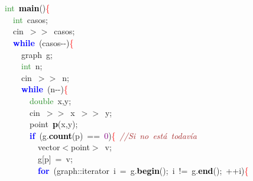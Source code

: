 \documentclass[10pt,a4paper,twoside]{article}
\begin{document}
{{{{{{\mbox{} \\
\mbox{} \\
\mbox{}\textcolor{ForestGreen}{int}\ \textbf{\textcolor{Black}{main}}\textcolor{BrickRed}{()}\textcolor{Red}{\{} \\
\mbox{}\ \ \textcolor{ForestGreen}{int}\ casos\textcolor{BrickRed}{;} \\
\mbox{}\ \ cin\ \textcolor{BrickRed}{$>>$}\ casos\textcolor{BrickRed}{;} \\
\mbox{}\ \ \textbf{\textcolor{Blue}{while}}\ \textcolor{BrickRed}{(}casos\textcolor{BrickRed}{-\/-)}\textcolor{Red}{\{} \\
\mbox{}\ \ \ \ graph\ g\textcolor{BrickRed}{;} \\
\mbox{}\ \ \ \ \textcolor{ForestGreen}{int}\ n\textcolor{BrickRed}{;} \\
\mbox{}\ \ \ \ cin\ \textcolor{BrickRed}{$>>$}\ n\textcolor{BrickRed}{;} \\
\mbox{}\ \ \ \ \textbf{\textcolor{Blue}{while}}\ \textcolor{BrickRed}{(}n\textcolor{BrickRed}{-\/-)}\textcolor{Red}{\{} \\
\mbox{}\ \ \ \ \ \ \textcolor{ForestGreen}{double}\ x\textcolor{BrickRed}{,}y\textcolor{BrickRed}{;} \\
\mbox{}\ \ \ \ \ \ cin\ \textcolor{BrickRed}{$>>$}\ x\ \textcolor{BrickRed}{$>>$}\ y\textcolor{BrickRed}{;} \\
\mbox{}\ \ \ \ \ \ point\ \textbf{\textcolor{Black}{p}}\textcolor{BrickRed}{(}x\textcolor{BrickRed}{,}y\textcolor{BrickRed}{);} \\
\mbox{}\ \ \ \ \ \ \textbf{\textcolor{Blue}{if}}\ \textcolor{BrickRed}{(}g\textcolor{BrickRed}{.}\textbf{\textcolor{Black}{count}}\textcolor{BrickRed}{(}p\textcolor{BrickRed}{)}\ \textcolor{BrickRed}{==}\ \textcolor{Purple}{0}\textcolor{BrickRed}{)}\textcolor{Red}{\{}\ \textit{\textcolor{Brown}{//Si\ no\ está\ todavía}} \\
\mbox{}\ \ \ \ \ \ \ \ vector\textcolor{BrickRed}{$<$}point\textcolor{BrickRed}{$>$}\ v\textcolor{BrickRed}{;} \\
\mbox{}\ \ \ \ \ \ \ \ g\textcolor{BrickRed}{[}p\textcolor{BrickRed}{]}\ \textcolor{BrickRed}{=}\ v\textcolor{BrickRed}{;} \\
\mbox{}\ \ \ \ \ \ \ \ \textbf{\textcolor{Blue}{for}}\ \textcolor{BrickRed}{(}graph\textcolor{BrickRed}{::}iterator\ i\ \textcolor{BrickRed}{=}\ g\textcolor{BrickRed}{.}\textbf{\textcolor{Black}{begin}}\textcolor{BrickRed}{();}\ i\ \textcolor{BrickRed}{!=}\ g\textcolor{BrickRed}{.}\textbf{\textcolor{Black}{end}}\textcolor{BrickRed}{();}\ \textcolor{BrickRed}{++}i\textcolor{BrickRed}{)}\textcolor{Red}{\{} \\
}}}}}}
\end{document}
